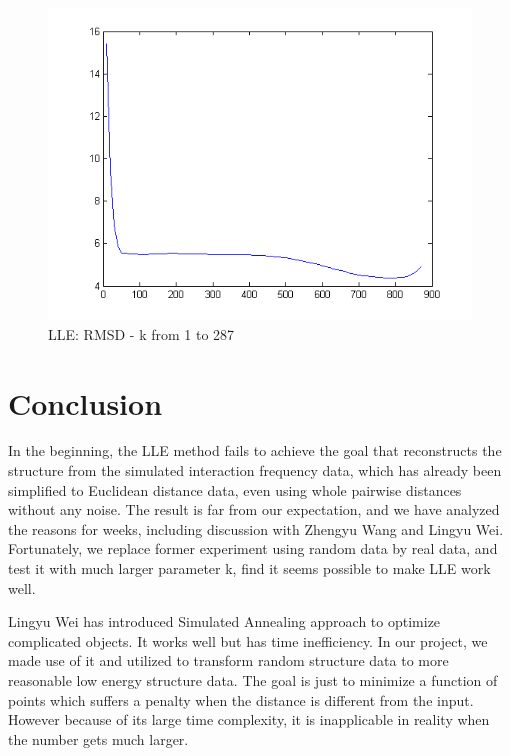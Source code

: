 \documentclass[12pt]{article} %
\begin{document}
\begin{figure}[ht]\centering
	\includegraphics[scale=0.5]{fig7}
	\caption{LLE: RMSD - k from 1 to 287}
\end{figure}


\section{Conclusion} %

In the beginning, the LLE method fails to achieve the goal that reconstructs the structure from the simulated interaction frequency data, which has already been simplified to Euclidean distance data, even using whole pairwise distances without any noise. The result is far from our expectation, and we have analyzed the reasons for weeks, including discussion with Zhengyu Wang and Lingyu Wei. Fortunately, we replace former experiment using random data by real data, and test it with much larger parameter k, find it seems possible to make LLE work well.

Lingyu Wei has introduced Simulated Annealing approach to optimize complicated objects. It works well but has time inefficiency. In our project, we made use of it and utilized to transform random structure data to more reasonable low energy structure data. The goal is just to minimize a function of points which suffers a penalty when the distance is different from the input. However because of its large time complexity, it is inapplicable in reality when the number gets much larger.
\end{document}
